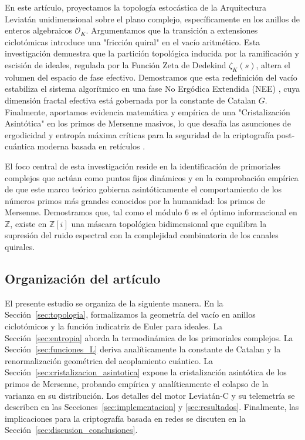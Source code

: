 \documentclass[12pt, a4paper]{article}
\theoremstyle{plain}
\theoremstyle{definition}
\theoremstyle{remark}
\newcommand{\Z}{\mathbb{Z}}
\newcommand{\OK}{\mathcal{O}_K}
\begin{document}
En este artículo, proyectamos la topología estocástica de la Arquitectura Leviatán unidimensional sobre el plano complejo, específicamente en los anillos de enteros algebraicos $\OK$. Argumentamos que la transición a extensiones ciclotómicas introduce una "fricción quiral" en el vacío aritmético. Esta investigación demuestra que la partición topológica inducida por la ramificación y escisión de ideales, regulada por la Función Zeta de Dedekind $\zeta_K(s)$, altera el volumen del espacio de fase efectivo. Demostramos que esta redefinición del vacío estabiliza el sistema algorítmico en una fase No Ergódica Extendida (NEE) \cite{Kravtsov2015, Khaymovich2021}, cuya dimensión fractal efectiva está gobernada por la constante de Catalan $G$. Finalmente, aportamos evidencia matemática y empírica de una "Cristalización Asintótica" \cite{Bourne2021} en los primos de Mersenne masivos, lo que desafía las asunciones de ergodicidad y entropía máxima críticas para la seguridad de la criptografía post-cuántica moderna basada en retículos \cite{Wenger2024, Peikert2009}.

El foco central de esta investigación reside en la identificación de primoriales complejos que actúan como puntos fijos dinámicos y en la comprobación empírica de que este marco teórico gobierna asintóticamente el comportamiento de los números primos más grandes conocidos por la humanidad: los primos de Mersenne. Demostramos que, tal como el módulo 6 es el óptimo informacional en $\Z$, existe en $\Z[i]$ una máscara topológica bidimensional que equilibra la supresión del ruido espectral con la complejidad combinatoria de los canales quirales.

\subsection*{Organización del artículo}

El presente estudio se organiza de la siguiente manera. En la Sección~\ref{sec:topologia}, formalizamos la geometría del vacío en anillos ciclotómicos y la función indicatriz de Euler para ideales. La Sección~\ref{sec:entropia} aborda la termodinámica de los primoriales complejos. La Sección~\ref{sec:funciones_L} deriva analíticamente la constante de Catalan y la renormalización geométrica del acoplamiento cuántico. La Sección~\ref{sec:cristalizacion_asintotica} expone la cristalización asintótica de los primos de Mersenne, probando empírica y analíticamente el colapso de la varianza en su distribución. Los detalles del motor Leviatán-C y su telemetría se describen en las Secciones~\ref{sec:implementacion} y \ref{sec:resultados}. Finalmente, las implicaciones para la criptografía basada en redes se discuten en la Sección~\ref{sec:discusion_conclusiones}.
\end{document}
